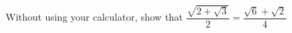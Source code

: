 {Without using your calculator, show that $\dfrac{\sqrt{2 + \sqrt{3}}}{2} = \dfrac{\sqrt{6} + \sqrt{2}}{4}$}
{}
